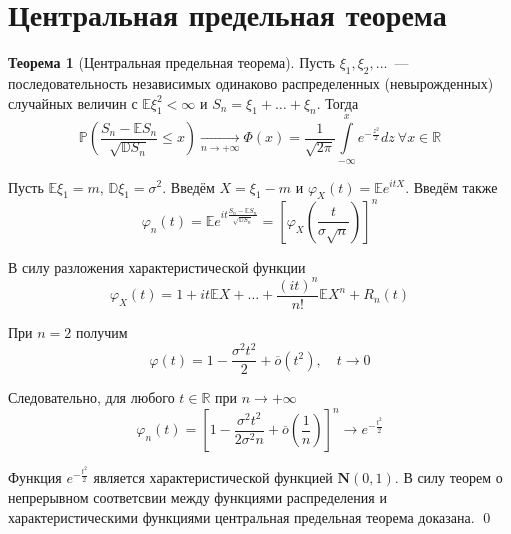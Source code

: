 \documentclass[oneside,final,14pt]{extreport}
\renewenvironment{proof}{{\bfseries Доказательство.}}{\qed}
\theoremstyle{plain}
\theoremstyle{definition}
\theoremstyle{named}
\newtheorem*{namedthm}{Теорема}
\begin{document}
\section{Центральная предельная теорема}
\begin{namedthm}[Центральная предельная теорема]
    Пусть $\xi_{1}, \xi_{2}, \ldots$~--- последовательность независимых одинаково распределенных (невырожденных) случайных величин с $\mathbb{E} \xi_{1}^{2}<\infty$ и $S_{n}=\xi_{1}+\ldots+\xi_{n}$. Тогда
    \begin{equation*}
        \mathbb{P}\left(\frac{S_{n}-\mathbb{E} S_{n}}{\sqrt{\mathbb{D} S_{n}}} \leqslant x\right)
        \xrightarrow[n \to +\infty]{}
        \Phi(x) = \frac{1}{\sqrt{2 \pi}} \int\limits_{-\infty}^{x} e^{-\frac{z^{2}}{2}} dz~ \forall x \in \mathbb{R}
    \end{equation*}
\end{namedthm}
\begin{proof}
Пусть $\mathbb{E} \xi_{1}=m,\, \mathbb{D} \xi_{1}=\sigma^{2}$. Введём $X = \xi_1 - m$ и $\varphi_X(t)=\mathbb{E} e^{i tX}$. Введём также
\begin{equation*}
    \varphi_{n}(t)=\mathbb{E} e^{i t \frac{S_{n}-\mathbb{E} S_{n}}{\sqrt{\mathbb{D} S_{n}}}} = 
    \left[\varphi_X\left(\frac{t}{\sigma \sqrt{n}}\right)\right]^{n}
\end{equation*}

В силу разложения характеристической функции
\begin{equation*}
    \varphi_{X}(t)=1+i t \mathbb{E} X+\ldots+\frac{(i t)^{n}}{n !} \mathbb{E} X^{n}+R_{n}(t)
\end{equation*}

При $n=2$ получим 
\begin{equation*}
    \varphi(t)=1-\frac{\sigma^{2} t^{2}}{2}+\overline{o}\left(t^{2}\right), \quad t \rightarrow 0
\end{equation*}

Следовательно, для любого $t \in \mathbb{R}$ при $n \to +\infty$
\begin{equation*}
    \varphi_{n}(t)=\left[1-\frac{\sigma^{2} t^{2}}{2 \sigma^{2} n}+\overline{o}\left(\frac{1}{n}\right)\right]^n \rightarrow e^{-\frac{t^{2}}{2}}
\end{equation*}

Функция $e^{-\frac{t^{2}}{2}}$ является характеристической функцией $\mathbf{N}(0,1)$. В силу теорем о непрерывном соответсвии между функциями распределения и характеристическими функциями центральная предельная теорема доказана.
\end{proof}
\end{document}
